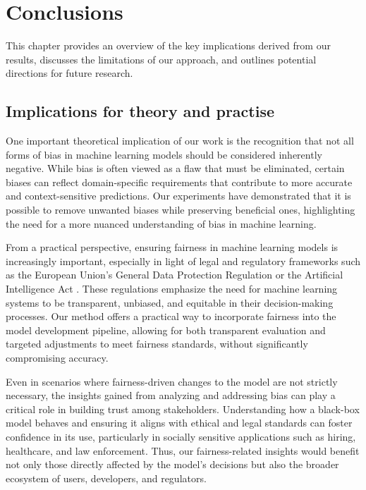 %
\chapter{Conclusions}
This chapter provides an overview of the key implications derived from our results,  
discusses the limitations of our approach,  
and outlines potential directions for future research. 


\section{Implications for theory and practise}
One important theoretical implication of our work is the recognition that not all forms of bias
in machine learning models should be considered inherently negative.  
While bias is often viewed as a flaw that must be eliminated,
certain biases can reflect domain-specific requirements
that contribute to more accurate and context-sensitive predictions.  
Our experiments have demonstrated that it is possible to remove unwanted biases
while preserving beneficial ones, highlighting the need for a more nuanced understanding of bias in machine learning. 

From a practical perspective, ensuring fairness in machine learning models is increasingly important,
especially in light of legal and regulatory frameworks such as
the European Union's General Data Protection Regulation \cite{gdpr} or the Artificial Intelligence Act \cite{aia}.  
These regulations emphasize the need for machine learning systems to be transparent,
unbiased, and equitable in their decision-making processes.  
Our method offers a practical way to incorporate fairness into the model development pipeline,
allowing for both transparent evaluation and targeted adjustments to meet fairness standards,
without significantly compromising accuracy.

Even in scenarios where fairness-driven changes to the model are not strictly necessary,
the insights gained from analyzing and addressing bias can play a critical role in building trust among stakeholders.  
Understanding how a black-box model behaves and ensuring it aligns
with ethical and legal standards can foster confidence in its use,
particularly in socially sensitive applications such as hiring, healthcare, and law enforcement.  
Thus, our fairness-related insights would benefit not only those directly affected by the model's decisions
but also the broader ecosystem of users, developers, and regulators.  


